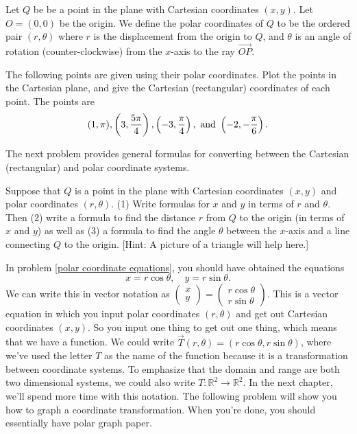 \begin{definition}
Let $Q$ be be a point in the plane with Cartesian coordinates $(x,y)$.  Let $O=(0,0)$ be the origin. We define the polar coordinates of $Q$ to be the ordered pair $(r,\theta)$ where $r$ is the displacement from the origin to $Q$, and $\theta$ is an angle of rotation (counter-clockwise) from the $x$-axis to the ray $\vec {OP}$.
\end{definition}

\begin{problem}  
The following points are given using their polar coordinates.  Plot the points in the Cartesian plane, and give the Cartesian (rectangular) coordinates of each point. The points are
$$
(1,\pi), 
\displaystyle \left( 3,\frac{5\pi}{4}\right),
\displaystyle \left( -3,\frac{\pi}{4}\right),\text{ and }
\displaystyle \left( -2,-\frac{\pi}{6}\right).$$
\end{problem}

The next problem provides general formulas for converting between the Cartesian (rectangular) and polar coordinate systems.

\begin{problem}\label{polar coordinate equations}  
Suppose that $Q$ is a point in the plane with Cartesian coordinates $(x,y)$ and polar coordinates $(r,\theta)$.  (1) Write formulas for $x$ and $y$ in terms of $r$ and $\theta$.  
Then (2) write a formula to find the distance $r$ from $Q$ to the origin (in terms of $x$ and $y$) as well as (3) a formula to find the angle $\theta$ between the $x$-axis and a line connecting $Q$ to the origin. [Hint: A picture of a triangle will help here.]
\end{problem}
 
In problem \ref{polar coordinate equations}, you should have obtained the equations 
$$x=r\cos\theta, \quad y=r\sin\theta.$$
We can write this in vector notation as $\begin{pmatrix}x\\y\end{pmatrix}=\begin{pmatrix}r\cos\theta\\ r\sin\theta\end{pmatrix}$.
This is a vector equation in which you input polar coordinates $(r,\theta)$ and get out Cartesian coordinates $(x,y)$.  
So you input one thing to get out one thing, which means that we have a function.  
We could write $\vec T(r,\theta) = (r\cos\theta,r\sin\theta)$, where we've used the letter $T$ as the name of the function because it is a transformation between coordinate systems. 
To emphasize that the domain and range are both two dimensional systems, we could also write $T:\mathbb{R}^2\to\mathbb{R}^2$. In the next chapter, we'll spend more time with this notation. The following problem will show you how to graph a coordinate transformation.  When you're done, you should essentially have polar graph paper.


